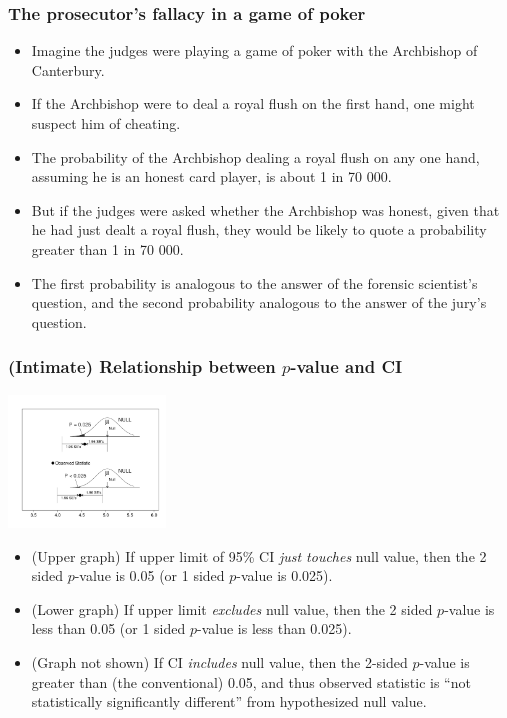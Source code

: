 \documentclass{beamer}\usepackage[]{graphicx}\usepackage[]{color}
\begin{document}
\begin{frame}
\frametitle{The prosecutor's fallacy in a game of poker}

\begin{itemize}
		\setlength\itemsep{1em}
		\item  Imagine the judges were playing a game of poker with the Archbishop of Canterbury. 
		\item If the Archbishop were to deal a royal flush on the first hand, one might suspect him of cheating. 
		\item The probability of the Archbishop dealing a royal flush on any one hand, assuming he is an honest card player, is about 1 in 70 000. 
		\item But if the judges were asked whether the Archbishop was honest, given that he had just dealt a royal flush, they would be likely to quote a probability greater than 1 in 70 000. \pause 
		\item The first probability is analogous to the answer of the forensic scientist's
		question, and the second probability analogous to the answer of the jury's
		question. 
\end{itemize}

\end{frame}


\begin{frame}
\frametitle{(Intimate) Relationship between $p$-value and CI}
\begin{center}
\includegraphics[width=1.65in]{P-CI.pdf}
\end{center} 
\begin{footnotesize}
\begin{itemize}
\item
(Upper graph) If upper limit of 95\% CI\textit{ just touches} null value, then
the 2 sided $p$-value is 0.05 (or 1 sided $p$-value is 0.025). \pause
\item
(Lower graph) If upper limit \textit{excludes} null value, then
the 2 sided $p$-value is less than 0.05 (or 1 sided $p$-value is less than 0.025). \pause
\item
(Graph not shown) If  CI \textit{includes} null value, then the 2-sided $p$-value is greater than (the conventional) 0.05, and thus observed statistic is ``not statistically significantly different'' from hypothesized null value. 
\end{itemize}
\end{footnotesize}
\end{frame}
\end{document}
